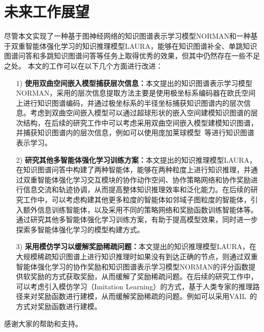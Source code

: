 \documentclass[algorithmlist, AutoFakeBold, AutoFakeSlant, figurelist, tablelist, nomlist, engineering]{seuthesix}
\begin{document}
\section{未来工作展望}
尽管本文实现了一种基于图神经网络的知识图谱表示学习模型NORMAN和一种基于双重智能体强化学习的知识推理模型LAURA，能够在知识图谱补全、单跳知识图谱问答和多跳知识图谱问答等任务上取得优秀的效果，但其中仍然存在一些不足之处。
本文的工作可以在以下几个方面进行改进：
\begin{itemize}
  \item [1)]\textbf{使用双曲空间嵌入模型捕获层次信息：}本文提出的知识图谱表示学习模型NORMAN，采用的层次信息提取方法主要是使用极坐标系编码器在欧氏空间上进行知识图谱编码，并通过极坐标系的半径坐标捕获知识图谱内的层次信息。考虑到双曲空间嵌入模型可以通过超球形状的嵌入空间建模知识图谱的层次结构，在后续的研究工作中可以考虑采用双曲空间嵌入模型建模知识图谱，并捕获知识图谱内的层次信息，例如可以使用庞加莱球模型~\cite{abramowicz2002poincare}等进行知识图谱表示学习。
  \item [2)]\textbf{研究其他多智能体强化学习训练方案：}本文提出的知识推理模型LAURA，在知识图谱问答中构建了两种智能体，能够在两种粒度上进行知识推理，并通过双重智能体强化学习交互模块的协作动作空间、协作策略网络和协作奖励进行信息交流和轨迹协调，从而提高整体知识推理效率和泛化能力。在后续的研究工作中，可以考虑构建其他更多粒度的智能体如邻域子图粒度的智能体，引入额外信息训练智能体，以及采用不同的策略网络和奖励函数训练智能体等。通过研究其他多智能体强化学习训练方案，有助于提高模型效果，同时进一步探索多智能体强化学习的模型构建方式。
  \item [3)]\textbf{采用模仿学习以缓解奖励稀疏问题：}本文提出的知识推理模型LAURA，在大规模稀疏知识图谱上进行知识推理时如果没有到达正确的节点，则通过双重智能体强化学习的协作奖励和知识图谱表示学习模型NORMAN的评分函数提供软奖励的方式获取奖励，从而缓解了奖励稀疏问题。在后续的研究工作中，可以考虑引入模仿学习（Imitation Learning）的方式，基于人类专家的推理路径来对奖励函数进行建模，从而缓解奖励稀疏的问题。例如可以采用VAIL~\cite{pengvariational}的方式对奖励函数进行建模。
\end{itemize}

\acknowledgement
感谢大家的帮助和支持。


% 
% 
% 
\end{document}
